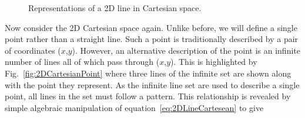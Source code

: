 \begin{figure}%
  \centering
  \caption{Representations of a 2D line in Cartesian space.}
  \label{fig:2DCartesianLineAndParameterPoint}
\end{figure}
\newline
\newline
Now consider the 2D Cartesian space again.  Unlike before, we will define a single point rather than a straight line. Such a point is traditionally described by a pair of coordinates ($x$,$y$).  However, an alternative description of the point is an infinite number of lines all of which pass through ($x$,$y$).  This is highlighted by Fig.~\ref{fig:2DCartesianPoint} where three lines of the infinite set are shown along with the point they represent.  As the infinite line set are used to describe a single point, all lines in the set must follow a pattern.  This relationship is revealed by simple algebraic manipulation of equation~\ref{eq:2DLineCartesean} to give
